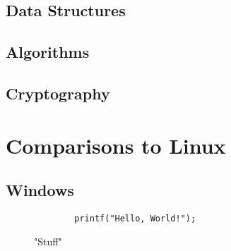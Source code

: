 \documentclass[10pt,draftclsnofoot,onecolumn,compsoc]{IEEEtran}
\begin{document}
	\subsection{Data Structures}
	
	\subsection{Algorithms}
	
	\subsection{Cryptography}

	\section{Comparisons to Linux}
	
	\subsection{Windows}
	
	
	
	
	\begin{figure}[H]
		\caption{"Stuff"}
		\begin{lstlisting}
		printf("Hello, World!");
		\end{lstlisting}
	\end{figure}

	

\end{document}
